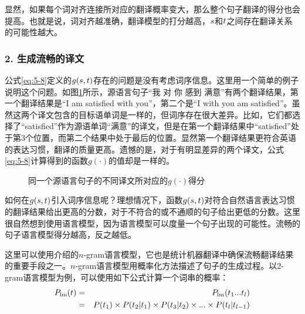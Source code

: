 \parinterval  显然，如果每个词对齐连接所对应的翻译概率变大，那么整个句子翻译的得分也会提高。也就是说，词对齐越准确，翻译模型的打分越高，${s}$和${t}$之间存在翻译关系的可能性越大。


\subsubsection{2. 生成流畅的译文}

\parinterval 公式\eqref{eq:5-8}定义的$g({s},{t})$存在的问题是没有考虑词序信息。这里用一个简单的例子说明这个问题。如图\ref{fig:5-8}所示，源语言句子“我 对 你 感到 满意”有两个翻译结果，第一个翻译结果是“I am satisfied with you”，第二个是“I with you am satisfied”。虽然这两个译文包含的目标语单词是一样的，但词序存在很大差异。比如，它们都选择了“satisfied”作为源语单词“满意”的译文，但是在第一个翻译结果中“satisfied”处于第3个位置，而第二个结果中处于最后的位置。显然第一个翻译结果更符合英语的表达习惯，翻译的质量更高。遗憾的是，对于有明显差异的两个译文，公式\eqref{eq:5-8}计算得到的函数$g(\cdot)$的值却是一样的。

\begin{figure}[htp]
    \centering

    \caption{同一个源语言句子的不同译文所对应的$g(\cdot)$得分}
    \label{fig:5-8}
\end{figure}

\parinterval 如何在$g({s},{t})$引入词序信息呢？理想情况下，函数$g({s},{t})$对符合自然语言表达习惯的翻译结果给出更高的分数，对于不符合的或不通顺的句子给出更低的分数。这里很自然想到使用语言模型，因为语言模型可以度量一个句子出现的可能性。流畅的句子语言模型得分越高，反之越低。

\parinterval 这里可以使用{\chaptertwo}介绍的$n$-gram语言模型，它也是统计机器翻译中确保流畅翻译结果的重要手段之一。$n$-gram语言模型用概率化方法描述了句子的生成过程。以2-gram语言模型为例，可以使用如下公式计算一个词串的概率：
\begin{eqnarray}
{P}_{\textrm{lm}}({t}) & = & {P}_{\textrm{lm}}(t_1...t_l) \nonumber \\
                                           & =  & {P}(t_1)\times {P}(t_2|t_1)\times {P}(t_3|t_2)\times ... \times {P}(t_l|t_{l-1})
\label{eq:5-10}
\end{eqnarray}

